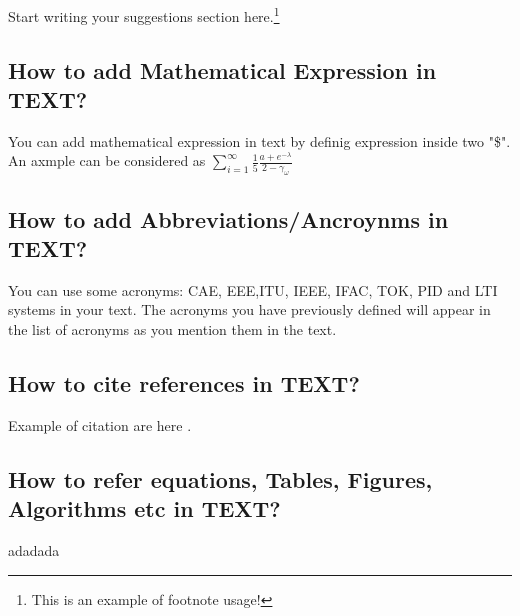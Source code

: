 Start writing your suggestions section here.\footnote{This is an example of footnote usage!}

\subsection{How to add Mathematical Expression in TEXT?}
You can add mathematical expression in text by definig expression inside two "\$". An axmple can be considered as $\sum_{i=1}^{\infty}\frac{1}{5}\frac{a+e^{-\lambda}}{2-\gamma_{\omega}}$


\subsection{How to add Abbreviations/Ancroynms in TEXT?}
You can use some acronyms: \ac{CAE}, \ac{EEE},\ac{ITU}, \ac{IEEE}, \ac{IFAC}, \ac{TOK}, \ac{PID} and \ac{LTI} systems in your text. The acronyms you have previously defined will appear in the list of acronyms as you mention them in the text.


\subsection{How to cite references in TEXT?}
Example of citation are here
\cite{AdaAroKre:71,PadScaAst:16a,PadScaAst:16b,PavVdWNij:06,PurBorVar:96,SLICOT,Sca:16,Sca:16a,Sca:16b,Sca:17,Sca:18}.
\subsection{How to refer equations, Tables, Figures, Algorithms etc in TEXT?}
adadada